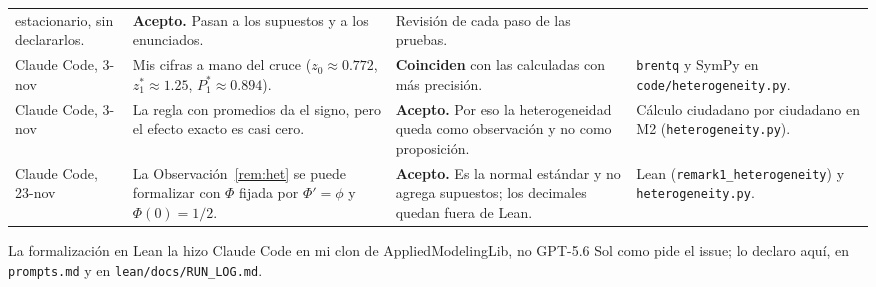 \documentclass[11pt]{article}
\theoremstyle{definition}
\newcommand{\1}{\mathbbm{1}}
\begin{document}
\begin{center}
\begin{tabular}{p{2.2cm}p{4.1cm}p{4.3cm}p{3.9cm}}
estacionario, sin declararlos. & \textbf{Acepto.} Pasan a los supuestos y a los enunciados. &
Revisión de cada paso de las pruebas. \\
Claude Code, 3-nov & Mis cifras a mano del cruce ($z_0\approx0.772$, $z_1^*\approx1.25$,
$P_1^*\approx0.894$). & \textbf{Coinciden} con las calculadas con más precisión. & \texttt{brentq} y
SymPy en \texttt{code/heterogeneity.py}. \\
Claude Code, 3-nov & La regla con promedios da el signo, pero el efecto exacto es casi cero. &
\textbf{Acepto.} Por eso la heterogeneidad queda como observación y no como proposición. & Cálculo
ciudadano por ciudadano en M2 (\texttt{heterogeneity.py}). \\
Claude Code, 23-nov & La Observación~\ref{rem:het} se puede formalizar con $\Phi$ fijada por
$\Phi'=\phi$ y $\Phi(0)=1/2$. & \textbf{Acepto.} Es la normal estándar y no agrega supuestos; los
decimales quedan fuera de Lean. & Lean (\texttt{remark1\_}\allowbreak\texttt{heterogeneity}) y
\texttt{heterogeneity.py}. \\
\bottomrule
\end{tabular}
\end{center}

La formalización en Lean la hizo Claude Code en mi clon de AppliedModelingLib, no GPT-5.6 Sol
como pide el issue; lo declaro aquí, en \texttt{prompts.md} y en \texttt{lean/docs/RUN\_LOG.md}.
\end{document}
